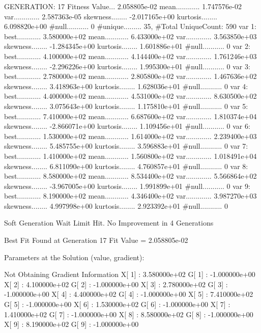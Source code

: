 \documentclass[oneside,letterpaper,titlepage]{article}
\begin{document}
\begin{Schunk}
\begin{Soutput}
GENERATION: 17
Fitness Value... 2.058805e-02
mean............ 1.747576e-02
var............. 2.587363e-05
skewness........ -2.017165e+00
kurtosis........ 6.098820e+00
#null........... 0
#unique......... 35, #Total UniqueCount: 590
var 1:
best............ 3.580000e+02
mean............ 6.433000e+02
var............. 3.563850e+03
skewness........ -1.284345e+00
kurtosis........ 1.601886e+01
#null........... 0
var 2:
best............ 4.100000e+02
mean............ 4.144400e+02
var............. 1.761246e+03
skewness........ -2.296226e+00
kurtosis........ 1.995300e+01
#null........... 0
var 3:
best............ 2.780000e+02
mean............ 2.805800e+02
var............. 1.467636e+02
skewness........ 3.418963e+00
kurtosis........ 1.628036e+01
#null........... 0
var 4:
best............ 4.400000e+02
mean............ 4.531000e+02
var............. 8.630500e+02
skewness........ 3.075643e+00
kurtosis........ 1.175810e+01
#null........... 0
var 5:
best............ 7.410000e+02
mean............ 6.687600e+02
var............. 1.810374e+04
skewness........ -2.866071e+00
kurtosis........ 1.109456e+01
#null........... 0
var 6:
best............ 1.530000e+02
mean............ 1.614000e+02
var............. 2.239400e+03
skewness........ 5.485755e+00
kurtosis........ 3.596883e+01
#null........... 0
var 7:
best............ 1.410000e+02
mean............ 1.560800e+02
var............. 1.018491e+04
skewness........ 6.811090e+00
kurtosis........ 4.760857e+01
#null........... 0
var 8:
best............ 8.580000e+02
mean............ 8.534400e+02
var............. 5.566864e+02
skewness........ -3.967005e+00
kurtosis........ 1.991899e+01
#null........... 0
var 9:
best............ 8.190000e+02
mean............ 4.346400e+02
var............. 3.987270e+03
skewness........ 4.997998e+00
kurtosis........ 2.923392e+01
#null........... 0

Soft Generation Wait Limit Hit.
No Improvement in 4 Generations

Best Fit Found at Generation 17
Fit Value = 2.058805e-02


Parameters at the Solution (value, gradient):


Not Obtaining Gradient Information
 X[ 1] :	3.580000e+02	G[ 1] :	-1.000000e+00
 X[ 2] :	4.100000e+02	G[ 2] :	-1.000000e+00
 X[ 3] :	2.780000e+02	G[ 3] :	-1.000000e+00
 X[ 4] :	4.400000e+02	G[ 4] :	-1.000000e+00
 X[ 5] :	7.410000e+02	G[ 5] :	-1.000000e+00
 X[ 6] :	1.530000e+02	G[ 6] :	-1.000000e+00
 X[ 7] :	1.410000e+02	G[ 7] :	-1.000000e+00
 X[ 8] :	8.580000e+02	G[ 8] :	-1.000000e+00
 X[ 9] :	8.190000e+02	G[ 9] :	-1.000000e+00


\end{Soutput}
\end{Schunk}
\end{document}
